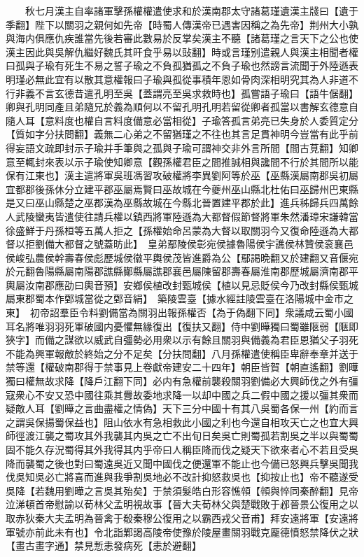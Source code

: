 　　秋七月漢主自率諸軍擊孫權權遣使求和於漢南郡太守諸葛瑾遺漢主牋曰【遺于季翻】陛下以關羽之親何如先帝【時蜀人傳漢帝已遇害因稱之為先帝】荆州大小孰與海内俱應仇疾誰當先後若審此數易於反掌矣漢主不聽【諸葛瑾之言天下之公也使漢主因此與吳解仇繼好魏氏其旰食乎易以䜴翻】時或言瑾别遣親人與漢主相聞者權曰孤與子瑜有死生不易之誓子瑜之不負孤猶孤之不負子瑜也然謗言流聞于外陸遜表明瑾必無此宜有以散其意權報曰子瑜與孤從事積年恩如骨肉深相明究其為人非道不行非義不言玄德昔遣孔明至吳【蓋謂亮至吳求救時也】孤嘗語子瑜曰【語牛倨翻】卿與孔明同產且弟隨兄於義為順何以不留孔明孔明若留從卿者孤當以書解玄德意自隨人耳【意料度也權自言料度備意必當相從】子瑜答孤言弟亮已失身於人委質定分【質如字分扶問翻】義無二心弟之不留猶瑾之不往也其言足貫神明今豈當有此乎前得妄語文疏即封示子瑜并手筆與之孤與子瑜可謂神交非外言所間【間古莧翻】知卿意至輒封來表以示子瑜使知卿意【觀孫權君臣之間推誠相與讒間不行於其間所以能保有江東也】漢主遣將軍吳班馮習攻破權將李異劉阿等於巫【巫縣漢屬南郡吳初屬宜都郡後孫休分立建平郡巫屬焉賢曰巫故城在今夔州巫山縣北杜佑曰巫歸州巴東縣是又曰巫山縣楚之巫郡漢為巫縣故城在今縣北晉置建平郡於此】進兵秭歸兵四萬餘人武陵蠻夷皆遣使往請兵權以鎮西將軍陸遜為大都督假節督將軍朱然潘璋宋謙韓當徐盛鮮于丹孫桓等五萬人拒之【孫權始命呂蒙為大督以取關羽今又復命陸遜為大都督以拒劉備大都督之號蓋昉此】　皇弟鄢陵侯彰宛侯據魯陽侯宇譙侯林贊侯衮襄邑侯峻弘農侯幹壽春侯彪歷城侯徽平輿侯茂皆進爵為公【鄢謁晩翻又於建翻又音偃宛於元翻魯陽縣屬南陽郡譙縣鄼縣屬譙郡襄邑屬陳留郡壽春屬淮南郡歷城屬濟南郡平輿屬汝南郡應劭曰輿音預】安鄉侯植改封甄城侯【植以見忌貶侯今乃改封縣侯甄城屬東郡蜀本作鄄城當從之鄄音絹】　築陵雲臺【據水經註陵雲臺在洛陽城中金市之東】　初帝詔羣臣令料劉備當為關羽出報孫權否【為于偽翻下同】衆議咸云蜀小國耳名將唯羽羽死軍破國内憂懼無緣復出【復扶又翻】侍中劉曄獨曰蜀雖陿弱【陿即狹字】而備之謀欲以威武自彊勢必用衆以示有餘且關羽與備義為君臣恩猶父子羽死不能為興軍報敵於終始之分不足矣【分扶問翻】八月孫權遣使稱臣卑辭奉章并送于禁等還【權破南郡得于禁事見上卷獻帝建安二十四年】朝臣皆賀【朝直遙翻】劉曄獨曰權無故求降【降戶江翻下同】必内有急權前襲殺關羽劉備必大興師伐之外有彊寇衆心不安又恐中國往乘其釁故委地求降一以却中國之兵二假中國之援以彊其衆而疑敵人耳【劉曄之言曲盡權之情偽】天下三分中國十有其八吳蜀各保一州【約而言之謂吳保揚蜀保益也】阻山依水有急相救此小國之利也今還自相攻天亡之也宜大興師徑渡江襲之蜀攻其外我襲其内吳之亡不出旬日矣吳亡則蜀孤若割吳之半以與蜀蜀固不能久存況蜀得其外我得其内乎帝曰人稱臣降而伐之疑天下欲來者心不若且受吳降而襲蜀之後也對曰蜀遠吳近又聞中國伐之便還軍不能止也今備已怒興兵擊吳聞我伐吳知吳必亡將喜而進與我爭割吳地必不改計抑怒救吳也【抑按止也】帝不聽遂受吳降【若魏用劉曄之言吳其殆矣】于禁須髮皓白形容憔顇【顇與悴同秦醉翻】見帝泣涕頓首帝慰諭以荀林父孟明視故事【晉大夫荀林父與楚戰敗于邲晉景公復用之以取赤狄秦大夫孟明為晉禽于殽秦穆公復用之以霸西戎父音甫】拜安遠將軍【安遠將軍號亦前此未有也】令北詣鄴謁高陵帝使豫於陵屋畫關羽戰克龎德憤怒禁降伏之狀【畫古畫字通】禁見慙恚發病死【恚於避翻】

